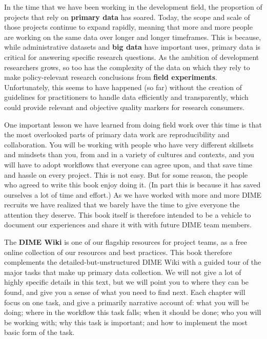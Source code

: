 In the time that we have been working in the development field,
the proportion of projects that rely on \textbf{primary data} has soared.\cite{angrist2017economic}
Today, the scope and scale of those projects continue to expand rapidly,
meaning that more and more people are working on the same data over longer and longer timeframes.
This is because, while administrative datasets
and \textbf{big data} have important uses,
primary data
is critical for answering specific research questions.\cite{levitt2009field}
As the ambition of development researchers grows, so too has the complexity of the data
on which they rely to make policy-relevant research conclusions from \textbf{field experiments}.
Unfortunately, this seems to have happened (so far) without the creation of
guidelines for practitioners to handle data efficiently and transparently,
which could provide relevant and objective quality markers for research consumers.

One important lesson we have learned from doing field work over this time is that
the most overlooked parts of primary data work are reproducibility and collaboration.
You will be working with people
who have very different skillsets and mindsets than you,
from and in a variety of cultures and contexts, and you will have to adopt workflows
that everyone can agree upon, and that save time and hassle on every project.
This is not easy. But for some reason, the people who agreed to write this book enjoy doing it.
(In part this is because it has saved ourselves a lot of time and effort.)
As we have worked with more and more DIME recruits
we have realized that we barely have the time to give everyone the attention they deserve.
This book itself is therefore intended to be a vehicle to document our experiences and share it with with future DIME team members.

The \textbf{DIME Wiki} is one of our flagship resources for project teams,
as a free online collection of our resources and best practices.
This book therefore complements the detailed-but-unstructured DIME Wiki
with a guided tour of the major tasks that make up primary data collection.
We will not give a lot of highly specific details in this text,
but we will point you to where they can be found,
and give you a sense of what you need to find next.
Each chapter will focus on one task,
and give a primarily narrative account of:
what you will be doing; where in the workflow this task falls;
when it should be done; who you will be working with;
why this task is important; and how to implement the most basic form of the task.

